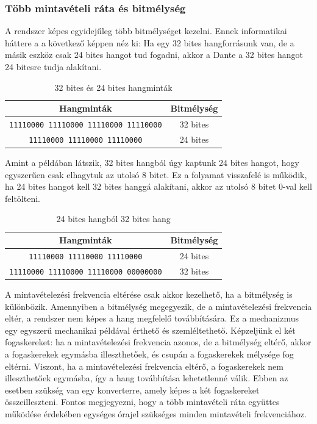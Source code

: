 \subsubsection{Több mintavételi ráta és bitmélység}
A rendszer képes egyidejűleg több bitmélységet kezelni. Ennek informatikai háttere a
a következő képpen néz ki:
Ha egy 32 bites hangforrásunk van, de a másik eszköz
csak 24 bites hangot tud fogadni, akkor a Dante a 32 bites hangot 24 bitesre tudja 
alakítani.
\begin{table}[h!]
	\centering
	\begin{tabular}{|c|c|}
	\hline
	\textbf{Hangminták} & \textbf{Bitmélység} \\
	\hline
	\texttt{11110000 11110000 11110000 11110000} & 32 bites \\
	\hline
	\texttt{11110000 11110000 11110000} & 24 bites \\
	\hline
	\end{tabular}
	\caption{32 bites és 24 bites hangminták}
	\label{tab:bit_depth_example}
\end{table}
Amint a példában látszik, 32 bites hangból úgy kaptunk 24 bites hangot, 
hogy egyszerűen csak elhagytuk az utolsó 8 bitet. Ez a folyamat visszafelé is működik,
ha 24 bites hangot kell 32 bites hanggá alakítani, akkor az utolsó 8 bitet 0-val kell feltölteni.
\begin{table}[h!]
	\centering
	\begin{tabular}{|c|c|}
	\hline
	\textbf{Hangminták} & \textbf{Bitmélység} \\
	\hline
	\texttt{11110000 11110000 11110000} & 24 bites \\
	\hline
	\texttt{11110000 11110000 11110000 00000000} & 32 bites \\
	\hline
	\end{tabular}
	\caption{24 bites hangból 32 bites hang}
	\label{tab:bit_depth_conversion}
\end{table}
A mintavételezési frekvencia eltérése csak akkor kezelhető, ha a bitmélység is különbözik. 
Amennyiben a bitmélység megegyezik, de a mintavételezési frekvencia eltér, a rendszer nem 
képes a hang megfelelő továbbítására. Ez a mechanizmus egy egyszerű mechanikai példával 
érthető és szemléltethető. Képzeljünk el két fogaskereket: ha a mintavételezési frekvencia 
azonos, de a bitmélység eltérő, akkor a fogaskerekek egymásba illeszthetőek, és csupán a 
fogaskerekek mélysége fog eltérni. Viszont, ha a mintavételezési frekvencia eltérő, a 
fogaskerekek nem illeszthetőek egymásba, így a hang továbbítása lehetetlenné válik. 
Ebben az esetben szükség van egy konverterre, amely képes a két fogaskereket összeilleszteni. 
Fontos megjegyezni, hogy a több mintavételi ráta együttes működése érdekében egységes 
órajel szükséges minden mintavételi frekvenciához.
